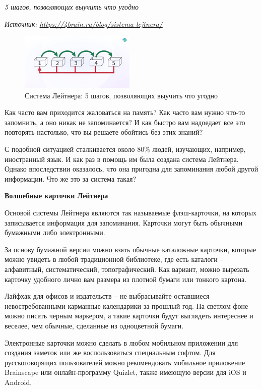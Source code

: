 \textit{5 шагов, позволяющих выучить что угодно}

\textit{Источник: \url{https://4brain.ru/blog/sistema-lejtnera/}}

\begin{figure}
    \begin{center}
        \includegraphics[width=0.49\textwidth]{img/sistema-lejtnera.png}
    \end{center}
    \caption{Система Лейтнера: 5 шагов, позволяющих выучить что угодно}
\end{figure}
Как часто вам приходится жаловаться на память? Как часто вам нужно что-то запомнить, а оно никак не запоминается? И как быстро вам надоедает все это повторять настолько, что вы решаете обойтись без этих знаний?

С подобной ситуацией сталкивается около 80\% людей, изучающих, например, иностранный язык. И как раз в помощь им была создана система Лейтнера. Однако впоследствии оказалось, что она пригодна для запоминания любой другой информации. Что же это за система такая?

\textbf{Волшебные карточки Лейтнера}

Основой системы Лейтнера являются так называемые флэш-карточки, на которых записывается информация для запоминания. Карточки могут быть обычными бумажными либо электронными.

За основу бумажной версии можно взять обычные каталожные карточки, которые можно увидеть в любой традиционной библиотеке, где есть каталоги – алфавитный, систематический, топографический. Как вариант, можно вырезать карточку удобного лично вам размера из плотной бумаги или тонкого картона.

Лайфхак для офисов и издательств – не выбрасывайте оставшиеся невостребованными карманные календарики за прошлый год. На светлом фоне можно писать черным маркером, а такие карточки будут выглядеть интереснее и веселее, чем обычные, сделанные из одноцветной бумаги.

Электронные карточки можно сделать в любом мобильном приложении для создания заметок или же воспользоваться специальным софтом. Для русскоговорящих пользователей можно рекомендовать мобильное приложение Brainscape или онлайн-программу Quizlet, также имеющую версии для iOS и Android.

